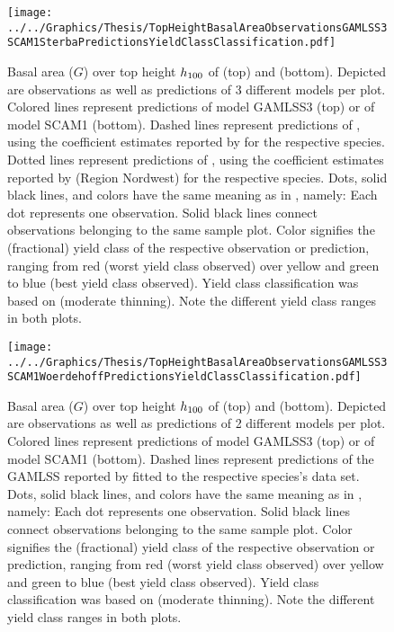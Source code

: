 \begin{figure}[h]
  \centering
  \texttt{[image: ../../Graphics/Thesis/TopHeightBasalAreaObservationsGAMLSS3SCAM1SterbaPredictionsYieldClassClassification.pdf]}
  \caption{Basal area (\(G\)) over top height \(h_{100}{}\) of \Beech{} (top) and \Spruce{} (bottom). Depicted are observations as well as predictions of 3 different models per plot.  Colored lines represent predictions of model GAMLSS3 (top) or of model SCAM1 (bottom).  Dashed lines represent predictions of , using the coefficient estimates reported by \textcite{Woerdehoff2016} for the respective species.  Dotted lines represent predictions of , using the coefficient estimates reported by \textcite{Doebbeler2004} (Region Nordwest) for the respective species.  Dots, solid black lines, and colors have the same meaning as in , namely:  Each dot represents one observation.  Solid black lines connect observations belonging to the same sample plot.  Color signifies the (fractional) yield class of the respective observation or prediction, ranging from red (worst yield class observed) over yellow and green to blue (best yield class observed).  Yield class classification was based on \textcite{Schober1995} (moderate thinning).  Note the different yield class ranges in both plots.}
  \label{fig:TopHeightBasalAreaObservationsGAMLSS3SCAM1SterbaPredictionsYieldClassClassification}
\end{figure}

\begin{figure}[h]
  \centering
  \texttt{[image: ../../Graphics/Thesis/TopHeightBasalAreaObservationsGAMLSS3SCAM1WoerdehoffPredictionsYieldClassClassification.pdf]}
  \caption{Basal area (\(G\)) over top height \(h_{100}{}\) of \Beech{} (top) and \Spruce{} (bottom). Depicted are observations as well as predictions of 2 different models per plot.  Colored lines represent predictions of model GAMLSS3 (top) or of model SCAM1 (bottom).  Dashed lines represent predictions of the GAMLSS reported by \textcite{Woerdehoff2016} fitted to the respective species’s data set.  Dots, solid black lines, and colors have the same meaning as in , namely:  Each dot represents one observation.  Solid black lines connect observations belonging to the same sample plot.  Color signifies the (fractional) yield class of the respective observation or prediction, ranging from red (worst yield class observed) over yellow and green to blue (best yield class observed).  Yield class classification was based on \textcite{Schober1995} (moderate thinning).  Note the different yield class ranges in both plots.}
  \label{fig:TopHeightBasalAreaObservationsGAMLSS3SCAM1WoerdehoffPredictionsYieldClassClassification}
\end{figure}


\clearpage{}

